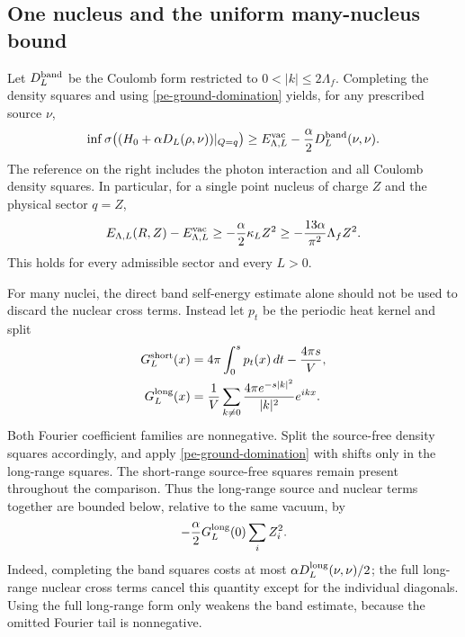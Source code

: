 \subsection{One nucleus and the uniform many-nucleus bound}

Let \(D_L^{\rm band}\) be the Coulomb form restricted to
\(0<|k|\le2\Lambda_f\). Completing the density squares and using
\eqref{pe-ground-domination} yields, for any prescribed source \(\nu\),
\begin{equation}
\inf\sigma\bigl((H_0+\alpha D_L(\rho,\nu))|_{Q=q}\bigr)
\ge E^{\rm vac}_{\Lambda,L}
 -\frac\alpha2D_L^{\rm band}(\nu,\nu).
\label{pe-band-response}
\end{equation}
The reference on the right includes the photon interaction and all
Coulomb density squares. In particular, for a single point nucleus
of charge \(Z\) and the physical sector \(q=Z\),
\begin{equation}
E_{\Lambda,L}(R,Z)-E^{\rm vac}_{\Lambda,L}
\ge-\frac\alpha2\kappa_L Z^2
\ge-\frac{13\alpha}{\pi^2}\Lambda_f Z^2.
\label{pe-one-nucleus}
\end{equation}
This holds for every admissible sector and every \(L>0\).

For many nuclei, the direct band self-energy estimate alone should not
be used to discard the nuclear cross terms. Instead let \(p_t\) be
the periodic heat kernel and split
\begin{align*}
G_L^{\rm short}(x)&=4\pi\int_0^s p_t(x)\,dt-\frac{4\pi s}{V},\\
G_L^{\rm long}(x)&=\frac1V\sum_{k\ne0}
             \frac{4\pi e^{-s|k|^2}}{|k|^2}e^{ikx}.
\end{align*}
Both Fourier coefficient families are nonnegative. Split the
source-free density squares accordingly, and apply
\eqref{pe-ground-domination} with shifts only in the long-range
squares. The short-range source-free squares remain present throughout
the comparison. Thus the long-range source and nuclear terms together
are bounded below, relative to the same vacuum, by
\[
-\frac\alpha2G_L^{\rm long}(0)\sum_iZ_i^2.
\]
Indeed, completing the band squares costs at most
\(\alpha D_L^{\rm long}(\nu,\nu)/2\); the full long-range nuclear
cross terms cancel this quantity except for the individual diagonals.
Using the full long-range form only weakens the band estimate, because
the omitted Fourier tail is nonnegative.

